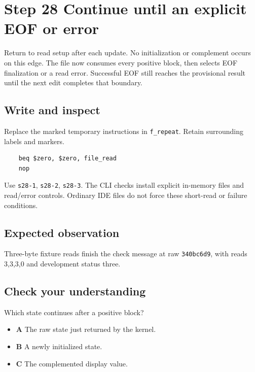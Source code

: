 \section{Step 28 Continue until an explicit EOF or error}\label{crc-s28}

Return to read setup after each update. No initialization or complement occurs on this edge. The file now consumes every positive block, then selects EOF finalization or a read error. Successful EOF still reaches the provisional result until the next edit completes that boundary.

\subsection{Write and inspect}
Replace the marked temporary instructions in \texttt{f\_repeat}. Retain surrounding labels and markers.

\begin{verbatim}
    beq $zero, $zero, file_read
    nop
\end{verbatim}

Use \texttt{s28-1}, \texttt{s28-2}, \texttt{s28-3}. The CLI checks install explicit in-memory files and read/error controls. Ordinary IDE files do not force these short-read or failure conditions.

\subsection{Expected observation}
Three-byte fixture reads finish the check message at raw \texttt{340bc6d9}, with reads 3,3,3,0 and development status three.

\subsection{Check your understanding}
Which state continues after a positive block?

\begin{itemize}
  \item \textbf{A} The raw state just returned by the kernel.
  \item \textbf{B} A newly initialized state.
  \item \textbf{C} The complemented display value.
\end{itemize}
